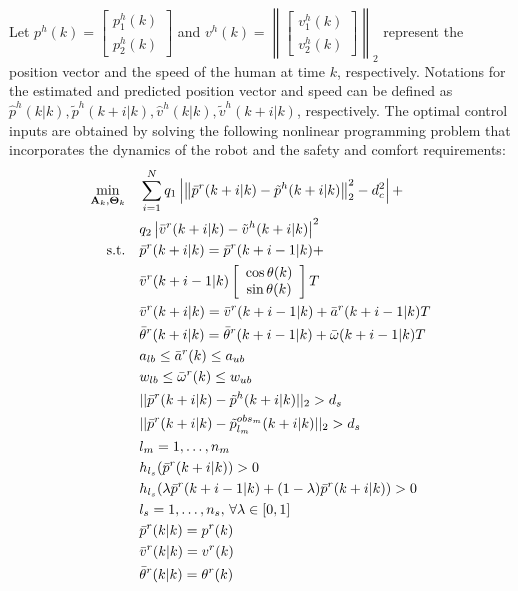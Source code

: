 \documentclass[letterpaper, 10 pt, conference]{ieeeconf}
\begin{document}
	Let $p^h(k)=
	\left[ 
	\begin{array}{c}
	p^h_1(k)\\
	p^h_2(k)
	\end{array}\right] $ and $v^h(k)=
	\left\|\left[ 
	\begin{array}{c}
	v^h_1(k)\\
	v^h_2(k)
	\end{array}\right]\right\|_2
	$ represent the position vector and the speed of the human at time $k$, respectively.
	Notations for the estimated and predicted position vector and speed can be defined as $\hat{p}^h(k|k),\tilde{p}^h(k+i|k),\hat{v}^h(k|k),\tilde{v}^h(k+i|k)$, respectively.
	The optimal control inputs are obtained by solving the following nonlinear programming problem that incorporates the dynamics of the robot and the safety and comfort requirements:
	\begin{subequations}\label{eqn:path_plan_mpc}
		\begin{align}
		\min_{\mathbf{A}_k,\mathbf{\Theta}_k} \quad &\sum\limits_{i=1}^{N} q_1\left| \left\|\bar{p}^r(k+i|k)-\tilde{p}^h(k+i|k)\right\|^2_2-d^2_{c}\right| + \notag\\
		& q_2\left|\bar{v}^r(k+i|k)-\tilde{v}^h(k+i|k)\right|^2\label{eqn:obj}\\
		\text{s.t.} \quad & \bar{p}^r(k+i|k)=\bar{p}^r(k+i-1|k)+\notag\\
		&\bar{v}^r(k+i-1|k)
		\left[ 
		\begin{array}{c}
		\cos \theta(k)\\
		\sin \theta(k)\\
		\end{array}
		\right]T\label{eqn:constr:dyn_pre_motion}\\
		& \bar{v}^r(k+i|k)=\bar{v}^r(k+i-1|k)+\bar{a}^r(k+i-1|k)T\label{eqn:constr:dyn_pre_v}\\       &\bar{\theta}^r(k+i|k)=\bar{\theta}^r(k+i-1|k)+\bar{\omega}(k+i-1|k)T\label{eqn:constr:dyn_pre_theta}\\
		& a_{lb}\le \bar{a}^r(k)\le a_{ub}\label{eqn:constr:a}\\
		& w_{lb}\le \bar{\omega}^r(k)\le w_{ub}\label{eqn:constr:w}\\
		& ||\bar{p}^r(k+i|k)-\tilde{p}^h(k+i|k)||_2> d_s\label{eqn:constr:safety_human}\\
		& ||\bar{p}^r(k+i|k)-\tilde{p}^{obs_m}_{l_m}(k+i|k)||_2> d_s\label{eqn:constr:safety_mv_obs}\\
		& l_m=1,\dots,n_m\notag\\
		& h_{l_s}(\bar{p}^r(k+i|k))> 0\label{eqn:constr:safety_s_obs1}\\
		& h_{l_s}(\lambda \bar{p}^r(k+i-1|k)+(1-\lambda)\bar{p}^r(k+i|k))> 0\label{eqn:constr:safety_s_obs2}\\
		& l_s=1,\dots,n_s,\, \forall \lambda\in \left[ 0, 1\right] \notag\\
		& \bar{p}^r(k|k)=p^r(k)\label{eqn:constr:init_z}\\
		& \bar{v}^r(k|k)=v^r(k)\label{eqn:constr:init_v}\\
		& \bar{\theta}^r(k|k)=\theta^r(k)\label{eqn:constr:init_theta}
		\end{align}
	\end{subequations}
\end{document}

